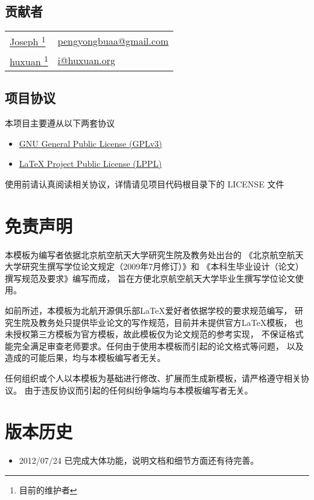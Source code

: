 \subsection{贡献者}
\begin{tabularx}{\textwidth}{@{\hspace{2em}}ll}
    \href{https://github.com/JosephPeng/}{Joseph \footnote{目前的维护者}} &
    \href{mailto:pengyongbuaa@gmail.com}{pengyongbuaa@gmail.com} \\
    \href{http://huxuan.org/}{huxuan \textsuperscript{1}} &
    \href{mailto:i@huxuan.org}{i@huxuan.org} \\
\end{tabularx}

\subsection{项目协议}
本项目主要遵从以下两套协议
\begin{itemize}
    \item \href{http://www.gnu.org/licenses/gpl.txt}
        {GNU General Public License (GPLv3)}
    \item \href{http://www.latex-project.org/lppl.txt}
        {\LaTeX{} Project Public License (LPPL)}
\end{itemize}
使用前请认真阅读相关协议，详情请见项目代码根目录下的 LICENSE 文件

\section{免责声明}
本模板为编写者依据北京航空航天大学研究生院及教务处出台的
《北京航空航天大学研究生撰写学位论文规定（2009年7月修订）》和
《本科生毕业设计（论文）撰写规范及要求》编写而成，
旨在方便北京航空航天大学毕业生撰写学位论文使用。

如前所述，本模板为北航开源俱乐部\LaTeX{}爱好者依据学校的要求规范编写，
研究生院及教务处只提供毕业论文的写作规范，目前并未提供官方\LaTeX{}模板，
也未授权第三方模板为官方模板，故此模板仅为论文规范的参考实现，
不保证格式能完全满足审查老师要求。任何由于使用本模板而引起的论文格式等问题，
以及造成的可能后果，均与本模板编写者无关。

任何组织或个人以本模板为基础进行修改、扩展而生成新模板，请严格遵守相关协议。
由于违反协议而引起的任何纠纷争端均与本模板编写者无关。

\section{版本历史}
\begin{itemize}
    \item[1.0] 2012/07/24 已完成大体功能，说明文档和细节方面还有待完善。
\end{itemize}
